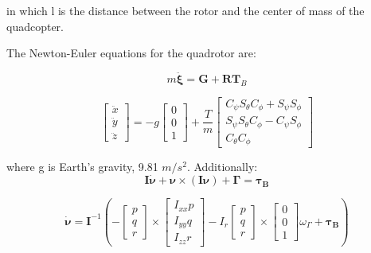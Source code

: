 \documentclass[letterpaper, 10 pt, conference]{ieeeconf}  %
\begin{document}
in which l is the distance between the rotor and the center of mass of the quadcopter.

The Newton-Euler equations for the quadrotor are:

$$m \ddot{\bm{\xi}}=\bm{G}+\bm{R} \bm{T}_{B}$$

$$\left[ \begin{array}{c}{\ddot{x}} \\ {\ddot{y}} \\ {\ddot{z}}\end{array}\right]=-g \left[ \begin{array}{l}{0} \\ {0} \\ {1}\end{array}\right]+\frac{T}{m} \left[ \begin{array}{c}{C_{\psi} S_{\theta} C_{\phi}+S_{\psi} S_{\phi}} \\ {S_{\psi} S_{\theta} C_{\phi}-C_{\psi} S_{\phi}} \\ {C_{\theta} C_{\phi}}\end{array}\right]$$

where g is Earth's gravity, 9.81 $m/s^2$. Additionally:
 $$\boldsymbol{I} \dot{\boldsymbol{\nu}}+\boldsymbol{\nu} \times(\boldsymbol{I} \boldsymbol{\nu})+\mathbf{\Gamma}=\boldsymbol{\tau_B}$$
 
 $$\boldsymbol{\dot{\nu}}=\boldsymbol{I}^{-1}\left(-\left[ \begin{array}{c}{p} \\ {q} \\ {r}\end{array}\right] \times \left[ \begin{array}{c}{I_{x x} p} \\ {I_{y y} q} \\ {I_{z z} r}\end{array}\right]-I_{r} \left[ \begin{array}{c}{p} \\ {q} \\ {r}\end{array}\right] \times \left[ \begin{array}{c}{0} \\ {0} \\ {1}\end{array}\right] \omega_{\Gamma}+\boldsymbol{\tau_B}\right)$$
 
\end{document}
